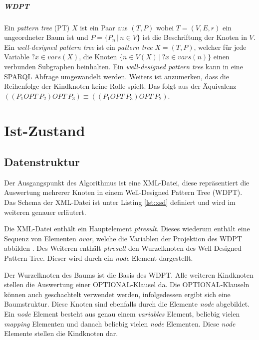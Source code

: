 \documentclass[draft,final]{vutinfth} %
\begin{document}
\cite{SPARQL,PAG09}


\paragraph{WDPT}
Ein \textit{pattern tree} (PT) $X$ ist ein Paar aus $(T,P)$ wobei $T = (V,E,r)$ ein ungeordneter Baum ist und $P = \{P_n \, | \, n \in V\}$ ist die Beschriftung der Knoten in $V$. Ein \textit{well-designed pattern tree} ist ein \textit{pattern tree }$X = (T,P)$, welcher für jede Variable $?x \in vars(X)$, die Knoten $\{n \in V(X)\, | \, ?x \in vars(n)\}$ einen verbunden Subgraphen beinhalten. Ein \textit{well-designed pattern tree} kann in eine SPARQL Abfrage umgewandelt werden. Weiters ist anzumerken, dass die Reihenfolge der Kindknoten keine Rolle spielt. Das folgt aus der Äquivalenz $\left( \left( P_1 OPT \ P_2 \right) OPT \ P_3 \right) \equiv \left( \left( P_1 OPT \ P_3 \right) OPT \ P_2 \right)$.

\cite{LPPS2013}

\chapter{Ist-Zustand} \label{istZustand}
\section{Datenstruktur} \label{dataStruk}
Der Ausgangspunkt des Algorithmus ist eine XML-Datei, diese repräsentiert die Auswertung  mehrerer Knoten in einem Well-Designed Pattern Tree (WDPT). Das Schema der XML-Datei ist unter Listing \ref{lst:xsd} definiert und wird im weiteren genauer erläutert.

Die XML-Datei enthält ein Hauptelement \textit{ptresult}. Dieses wiederum enthält eine Sequenz von Elementen \textit{ovar}, welche die Variablen der Projektion des WDPT abbilden \cite{OptMat}. Des Weiteren enthält \textit{ptresult} den Wurzelknoten des Well-Designed Pattern Tree. Dieser wird durch ein \textit{node} Element dargestellt.

Der Wurzelknoten des Baums ist die Basis des WDPT. Alle weiteren Kindknoten stellen die Auswertung einer OPTIONAL-Klausel da. Die OPTIONAL-Klauseln können auch geschachtelt verwendet werden, infolgedessen ergibt sich eine Baumstruktur. Diese Knoten sind ebenfalls durch die Elemente \textit{node} abgebildet. Ein \textit{node} Element besteht aus genau einem \textit{variables} Element, beliebig vielen \textit{mapping} Elementen und danach beliebig vielen \textit{node} Elementen. Diese \textit{node} Elemente stellen die Kindknoten dar.
\end{document}
